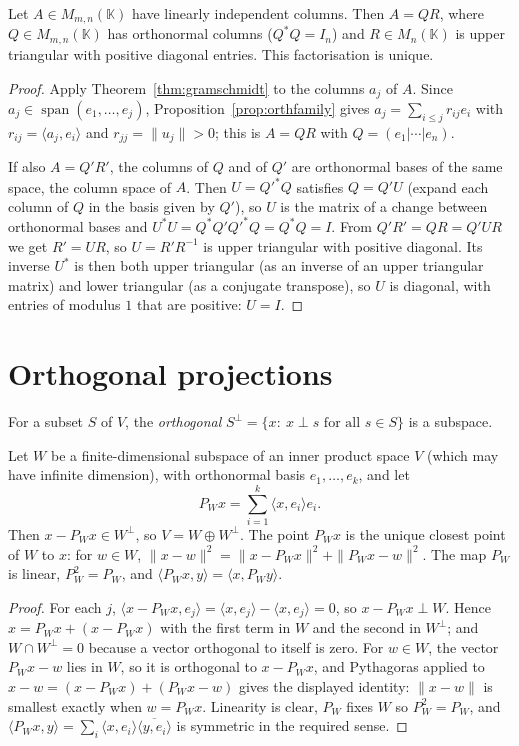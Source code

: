 \begin{corollary}[$QR$ factorisation]\label{cor:qr}
Let $A\in M_{m,n}(\mathbb K)$ have linearly independent columns. Then $A=QR$, where $Q\in M_{m,n}(\mathbb K)$ has orthonormal
columns ($Q^*Q=I_n$) and $R\in M_n(\mathbb K)$ is upper triangular with positive diagonal entries. This factorisation is
unique.
\end{corollary}
\begin{proof}
Apply Theorem~\ref{thm:gramschmidt} to the columns $a_j$ of $A$. Since $a_j\in\operatorname{span}(e_1,\dots,e_j)$,
Proposition~\ref{prop:orthfamily} gives $a_j=\sum_{i\le j}r_{ij}e_i$ with $r_{ij}=\langle a_j,e_i\rangle$ and
$r_{jj}=\|u_j\|>0$; this is $A=QR$ with $Q=(e_1|\cdots|e_n)$.

If also $A=Q'R'$, the columns of $Q$ and of $Q'$ are orthonormal bases of the same space, the column space of $A$.
Then $U=Q'^*Q$ satisfies $Q=Q'U$ (expand each column of $Q$ in the basis given by $Q'$), so $U$ is the matrix of a change
between orthonormal bases and $U^*U=Q^*Q'Q'^*Q=Q^*Q=I$. From $Q'R'=QR=Q'UR$ we get $R'=UR$, so $U=R'R^{-1}$ is upper
triangular with positive diagonal. Its inverse $U^*$ is then both upper triangular (as an inverse of an upper triangular
matrix) and lower triangular (as a conjugate transpose), so $U$ is diagonal, with entries of modulus $1$ that are
positive: $U=I$.
\end{proof}

\section{Orthogonal projections}

For a subset $S$ of $V$, the \emph{orthogonal} $S^\perp=\{x:\ x\perp s\text{ for all }s\in S\}$ is a subspace.

\begin{theorem}\label{thm:projection}
Let $W$ be a finite-dimensional subspace of an inner product space $V$ (which may have infinite dimension), with
orthonormal basis $e_1,\dots,e_k$, and let
\[
P_Wx=\sum_{i=1}^k\langle x,e_i\rangle e_i.
\]
Then $x-P_Wx\in W^\perp$, so $V=W\oplus W^\perp$. The point $P_Wx$ is the unique closest point of $W$ to $x$: for
$w\in W$, $\|x-w\|^2=\|x-P_Wx\|^2+\|P_Wx-w\|^2$. The map $P_W$ is linear, $P_W^2=P_W$, and
$\langle P_Wx,y\rangle=\langle x,P_Wy\rangle$.
\end{theorem}
\begin{proof}
For each $j$, $\langle x-P_Wx,e_j\rangle=\langle x,e_j\rangle-\langle x,e_j\rangle=0$, so $x-P_Wx\perp W$. Hence
$x=P_Wx+(x-P_Wx)$ with the first term in $W$ and the second in $W^\perp$; and $W\cap W^\perp=0$ because a vector
orthogonal to itself is zero. For $w\in W$, the vector $P_Wx-w$ lies in $W$, so it is orthogonal to $x-P_Wx$, and
Pythagoras applied to $x-w=(x-P_Wx)+(P_Wx-w)$ gives the displayed identity: $\|x-w\|$ is smallest exactly when $w=P_Wx$.
Linearity is clear, $P_W$ fixes $W$ so $P_W^2=P_W$, and $\langle P_Wx,y\rangle=\sum_i\langle x,e_i\rangle\overline{\langle
y,e_i\rangle}$ is symmetric in the required sense.
\end{proof}

